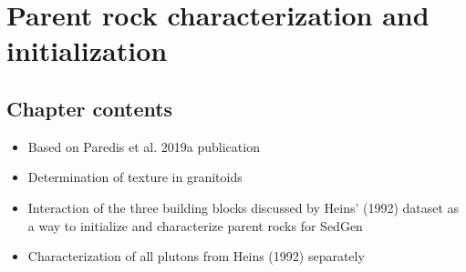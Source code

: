 \chapter{Parent rock characterization and initialization}\label{ch:parent_rock_characteristics}

\section{Chapter contents}
\begin{itemize}
    \item Based on Paredis et al. 2019a publication
    \item Determination of texture in granitoids
    \item Interaction of the three building blocks discussed by Heins’ (1992) dataset as a way to initialize and characterize parent rocks for SedGen
    \item Characterization of all plutons from Heins (1992) separately

\end{itemize}

\section{}



\cleardoublepage

